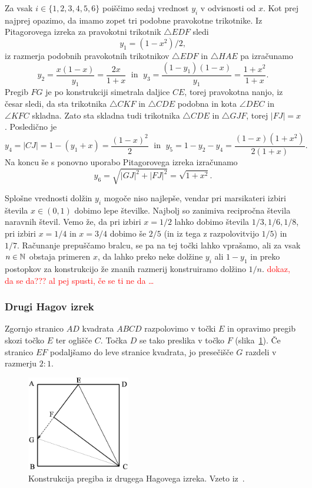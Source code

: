 Za vsak $i \in \{1,2,3,4,5,6\}$ poiščimo sedaj vrednost $y_i$ v odvisnosti od $x$. Kot prej najprej opazimo, da imamo zopet tri podobne pravokotne trikotnike. Iz Pitagorovega izreka za pravokotni trikotnik $\triangle EDF$ sledi
$$y_1 = (1-x^2)/2,$$
iz razmerja podobnih pravokotnih trikotnikov $\triangle EDF$ in $\triangle HAE$ pa izračunamo
$$ y_2 = \frac{x(1-x)}{y_1} = \frac{2x}{1+x} \; \text{ in } \; y_3 = \frac{(1-y_1)(1-x)}{y_1} = \frac{1+x^2}{1+x}.$$
Pregib $FG$ je po konstrukciji simetrala daljice $CE$, torej pravokotna nanjo, iz česar sledi, da sta trikotnika $\triangle CKF$ in $\triangle CDE$ podobna in kota $\angle DEC$ in $\angle KFC$ skladna. Zato sta skladna tudi trikotnika $\triangle CDE$ in $\triangle GJF$, torej $|FJ| = x$. Posledično je
$$y_4 = |CJ| = 1 - (y_1 + x) = \frac{(1-x)^2}{2} \; \text{ in } \; y_5 = 1 - y_2 - y_4 = \frac{(1-x)(1+x^2)}{2(1+x)}.$$
Na koncu še s ponovno uporabo Pitagorovega izreka izračunamo
$$ y_6 = \sqrt{|GJ|^2 + |FJ|^2} = \sqrt{1 + x^2}.$$

Splošne vrednosti dolžin $y_i$ mogoče niso najlepše, vendar pri marsikateri izbiri števila $x \in (0,1)$ dobimo lepe številke. Najbolj so zanimiva recipročna števila naravnih števil. Vemo že, da pri izbiri $x = 1/2$ lahko dobimo števila $1/3, 1/6, 1/8$, pri izbiri $x = 1/4$ in $x = 3/4$ dobimo še $2/5$ (in iz tega z razpolovitvijo $1/5$) in $1/7$. Računanje prepuščamo bralcu, se pa na tej točki lahko vprašamo, ali za vsak $n \in \mathbb N$ obstaja primeren $x$, da lahko preko neke dolžine $y_i$ ali $1-y_1$ in preko postopkov za konstrukcijo že znanih razmerij konstruiramo dolžino $1/n$. \textcolor{red}{dokaz, da se da??? al pej spusti, če se ti ne da \ldots}

\subsubsection{Drugi Hagov izrek}

\begin{izrek}
    Zgornjo stranico $AD$ kvadrata $ABCD$ razpolovimo v točki $E$ in opravimo pregib skozi točko $E$ ter oglišče $C$. Točka $D$ se tako preslika v točko $F$ (slika~\ref{fig:hagov_izrek2}). Če stranico $EF$ podaljšamo do leve stranice kvadrata, jo presečišče $G$ razdeli v razmerju $2:1$.
\end{izrek}

\begin{figure}[h]
    \centering
    \includegraphics[width=0.4\textwidth]{images/hagovi_izreki/hagov_izrek2.png}
    \caption[Pregib iz drugega Hagovega izreka]{Konstrukcija pregiba iz drugega Hagovega izreka. Vzeto iz~\cite[str. 12]{haga2008}.}
    \label{fig:hagov_izrek2}
\end{figure}

